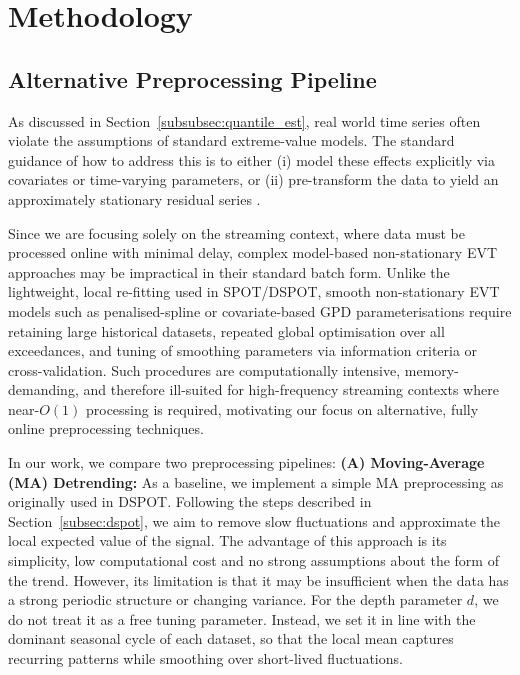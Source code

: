 \documentclass{statsmsc}
\begin{document}
\section{Methodology}\label{sec:methods}

\subsection{Alternative Preprocessing Pipeline}\label{subsec:alternative_pipeline}

As discussed in Section~\ref{subsubsec:quantile_est}, real world time series often violate the assumptions of 
standard extreme-value models. The standard guidance of how to address this is to 
either (i) model these effects explicitly via covariates or time-varying parameters, 
or (ii) pre-transform the data to yield an approximately stationary residual series 
\citep{Coles2001,DavisonSmith1990}. 

Since we are focusing solely on the streaming context, 
where data must be processed online with minimal delay, 
complex model-based non-stationary EVT approaches may be impractical in their standard batch form. 
Unlike the lightweight, local re-fitting used in SPOT/DSPOT, 
smooth non-stationary EVT models such as penalised-spline or covariate-based GPD parameterisations 
\citep{ChavezDemoulinDavison2005,NorthropJonathan2011} 
require retaining large historical datasets, repeated global optimisation over all exceedances, 
and tuning of smoothing parameters via information criteria or cross-validation. 
Such procedures are computationally intensive, memory-demanding, and therefore 
ill-suited for high-frequency streaming contexts where near-$O(1)$ processing 
is required, motivating our focus on alternative, fully online preprocessing techniques. 

In our work, we compare two preprocessing pipelines:
\textbf{(A) Moving-Average (MA) Detrending:} As a baseline, 
we implement a simple MA preprocessing as originally used in DSPOT.
Following the steps described in Section~\ref{subsec:dspot}, we aim to remove slow fluctuations 
and approximate the local expected value of the signal. The advantage of this approach is its simplicity, 
low computational cost and no strong assumptions about the form of the trend. 
However, its limitation is that it may be insufficient when the data has a 
strong periodic structure or changing variance. For the depth parameter \( d \), we do not treat it as a 
free tuning parameter. Instead, we set it in line with the dominant seasonal cycle of each dataset, 
so that the local mean captures recurring patterns while smoothing over short-lived fluctuations.
\end{document}
